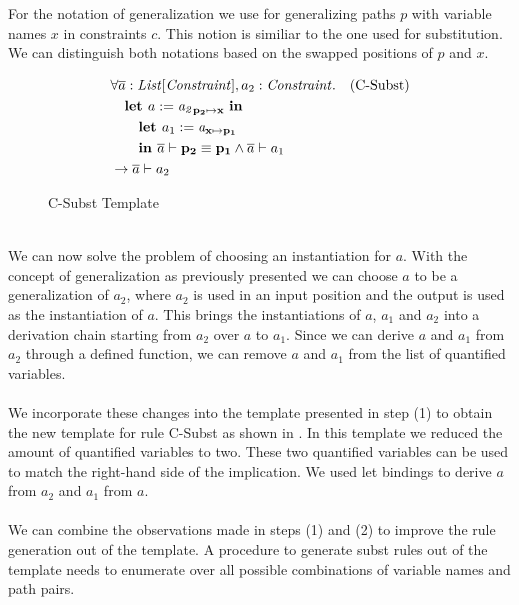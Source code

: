 For the notation of generalization we use  for
generalizing paths $p$ with variable names $x$ in constraints $c$.
This notion is similiar to the one used for substitution.
We can distinguish both notations based on the swapped positions
of $p$ and $x$.
%
\begin{figure}[h]
\begin{align*}
&\forall \ovl a: \Constrs, a_2: \Constr. && \text{(C-Subst)}\\
&\quad \Let a := \gen{a_2}{\mathbf{p_2}}{\mathbf{x}}\ \In\\%
&\qquad \Let a_1 := \subst{a}{\mathbf{x}}{\mathbf{p_1}}\\ %
&\qquad \In
        \entails{\ovl a}{\pathEq{\mathbf{p_2}}{\mathbf{p_1}}}
        \land
        \entails{\ovl a}{a_1}\\
&\rightarrow \entails{\ovl a}{a_2}
\end{align*}
\caption{C-Subst Template}
\label{fig:axioms-csubst}
\end{figure}\\
We can now solve the problem of choosing an instantiation for $a$.
With the concept of generalization as previously presented
we can choose $a$ to be a generalization of $a_2$,
where $a_2$ is used in an input position
and the output is used as the instantiation of $a$.
This brings the instantiations of $a$, $a_1$ and $a_2$
into a derivation chain starting from
$a_2$ over $a$ to $a_1$.
Since we can derive $a$ and $a_1$ from $a_2$ through a defined function,
we can remove $a$ and $a_1$ from the list of quantified variables.\\
\\
We incorporate these changes into the template presented in step (1)
to obtain the new template for rule C-Subst as shown in .
In this template we reduced the amount of quantified variables to two.
These two quantified variables can be used to match the right-hand side
of the implication.
We used let bindings to derive $a$ from $a_2$ and $a_1$ from $a$.\\
\\
We can combine the observations made in steps (1) and (2)
to improve the rule generation out of the template.
A procedure to generate subst rules out of the template
needs to enumerate over all possible combinations of
variable names and path pairs.

